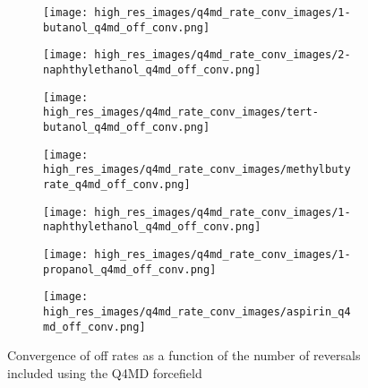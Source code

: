 \begin{figure}
\begin{subfigure}{0.3\linewidth}
	\centering
	\texttt{[image: high\_res\_images/q4md\_rate\_conv\_images/1-butanol\_q4md\_off\_conv.png]}
	\end{subfigure}%
\begin{subfigure}{0.3\linewidth}
		\texttt{[image: high\_res\_images/q4md\_rate\_conv\_images/2-naphthylethanol\_q4md\_off\_conv.png]}
\end{subfigure}%
	\begin{subfigure}{0.3\linewidth}
		\texttt{[image: high\_res\_images/q4md\_rate\_conv\_images/tert-butanol\_q4md\_off\_conv.png]}
	\end{subfigure}
	\begin{subfigure}{0.3\linewidth}
		\texttt{[image: high\_res\_images/q4md\_rate\_conv\_images/methylbutyrate\_q4md\_off\_conv.png]}
	\end{subfigure}
	\begin{subfigure}{0.3\linewidth}
		\texttt{[image: high\_res\_images/q4md\_rate\_conv\_images/1-naphthylethanol\_q4md\_off\_conv.png]}
	\end{subfigure}
	\begin{subfigure}{0.3\linewidth}
		\texttt{[image: high\_res\_images/q4md\_rate\_conv\_images/1-propanol\_q4md\_off\_conv.png]}
	\end{subfigure}
	\begin{subfigure}{0.3\linewidth}
		\texttt{[image: high\_res\_images/q4md\_rate\_conv\_images/aspirin\_q4md\_off\_conv.png]}
	\end{subfigure}
	\caption{Convergence of off rates as a function of the number of reversals included using the Q4MD forcefield}
\end{figure}